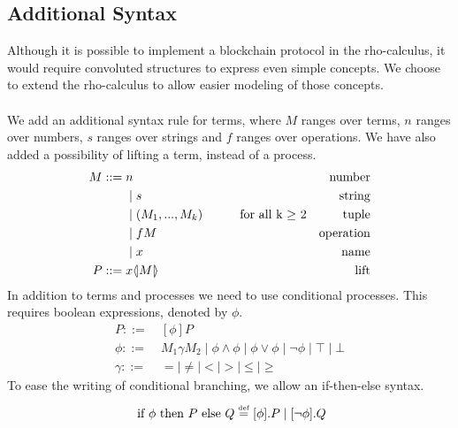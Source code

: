 \subsection{Additional Syntax} \label{sec:addsyntax}
Although it is possible to implement a blockchain protocol in the rho-calculus, it would require convoluted structures to express even simple concepts.
We choose to extend the rho-calculus to allow easier modeling of those concepts.\\
\\
We add an additional syntax rule for terms, where $M$ ranges over terms, $n$ ranges over numbers, $s$ ranges over strings and $f$ ranges over operations. We have also added a possibility of lifting a term, instead of a process.
\begin{align*}
M::=\; & n &\text{number}\\
 &\mid s &\text{string}\\
 &\mid (M_1,...,M_k)\quad\quad\quad \text{for all k $\geq$ 2} &\text{tuple}\\
 &\mid fM &\text{operation}\\
 &\mid x &\text{name}\\ 
P::=\;& x \langle \! | M | \! \rangle&\text{lift}
 \end{align*}
In addition to terms and processes we need to use conditional processes. This requires boolean expressions, denoted by \ensuremath{\phi}.
\begin{align*}
P::=& \ [\phi] P\\
\phi ::=& \ M_1\gamma M_2 \mid \phi\land\phi \mid \phi\lor\phi \mid \neg\phi \mid \top \mid \bot\\
\gamma ::=& \ = \mid \neq \mid < \mid > \mid \leq \mid \geq
\end{align*}
To ease the writing of conditional branching, we allow an if-then-else syntax.
\begin{align*}
	\text{ if }\phi\text{ then }P\text{ else }Q \overset{\underset{\mathrm{def}}{}}{=} [\phi].P \mid [\neg \phi].Q
\end{align*}


